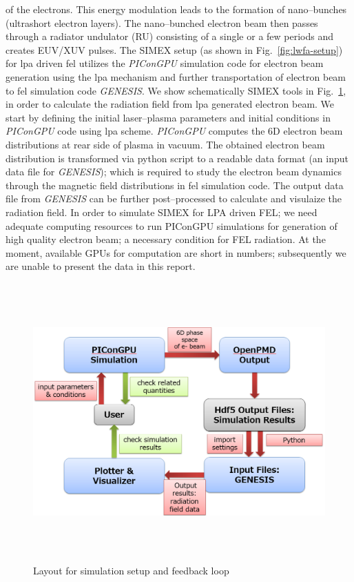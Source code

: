 of the electrons. This energy modulation leads to the formation of nano--bunches
(ultrashort electron layers). The nano--bunched electron beam then passes through
a radiator undulator (RU) consisting of a single or a few periods and creates
EUV/XUV pulses.
%
The SIMEX setup (as shown in Fig.~\ref{fig:lwfa-setup}) for \gls{lpa} driven \gls{fel}
utilizes the \textit{PIConGPU} simulation code for electron beam generation using the \gls{lpa}
mechanism and further transportation of electron beam to \gls{fel} simulation code
\textit{GENESIS}. We show schematically SIMEX tools in
Fig.~\ref{fig:lwfa-simulation_loop}, in order to calculate the radiation field
from \gls{lpa} generated electron beam. We start by defining the initial laser--plasma
parameters and initial conditions in \textit{PIConGPU} code using \gls{lpa} scheme.
\textit{PIConGPU} computes the 6D electron beam distributions at rear
side of  plasma in vacuum. The obtained electron beam distribution is
transformed via python script to a readable data format (an input data file for
\textit{GENESIS}); which is required to study the electron beam dynamics through the
magnetic field distributions in \gls{fel} simulation code. The output data file from
\textit{GENESIS} can be further post--processed to calculate and visulaize the radiation
field.
In order to simulate SIMEX for LPA driven FEL; we need adequate computing resources to run PIConGPU simulations for generation of high quality electron beam; a necessary condition for FEL radiation. At the moment, available GPUs for computation are short in numbers; subsequently we are unable to present the data in this report.   
\begin{figure}[ht]
  \begin{center}%
    \includegraphics[width=5.9425in,height=4.1882in]{figures/lwfafel-img002.png}
    \caption{Layout for simulation setup and feedback loop}
    \label{fig:lwfa-simulation_loop}
  \end{center}%
\end{figure}
%
